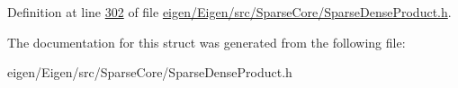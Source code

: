 Definition at line \hyperlink{eigen_2_eigen_2src_2_sparse_core_2_sparse_dense_product_8h_source_l00302}{302} of file \hyperlink{eigen_2_eigen_2src_2_sparse_core_2_sparse_dense_product_8h_source}{eigen/\+Eigen/src/\+Sparse\+Core/\+Sparse\+Dense\+Product.\+h}.



The documentation for this struct was generated from the following file\+:\begin{DoxyCompactItemize}
\item 
eigen/\+Eigen/src/\+Sparse\+Core/\+Sparse\+Dense\+Product.\+h\end{DoxyCompactItemize}
